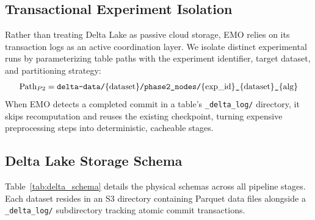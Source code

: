 \documentclass[conference,compsoc]{IEEEtran}
\begin{document}
\subsection{Transactional Experiment Isolation}
Rather than treating Delta Lake as passive cloud storage, EMO relies on its transaction logs as an active coordination layer. We isolate distinct experimental runs by parameterizing table paths with the experiment identifier, target dataset, and partitioning strategy:
\begin{equation}
\resizebox{0.95\linewidth}{!}{$
\mathrm{Path}_{P2} = \texttt{delta\text{-}data/}\{\mathrm{dataset}\}\texttt{/phase2\_nodes/}\{\mathrm{exp\_id}\}\texttt{\_}\{\mathrm{dataset}\}\texttt{\_}\{\mathrm{alg}\}
$}
\end{equation}
When EMO detects a completed commit in a table's \verb|_delta_log/| directory, it skips recomputation and reuses the existing checkpoint, turning expensive preprocessing steps into deterministic, cacheable stages.

\subsection{Delta Lake Storage Schema}
\label{sec:delta_schema}
Table~\ref{tab:delta_schema} details the physical schemas across all pipeline stages. Each dataset resides in an S3 directory containing Parquet data files alongside a \texttt{\_delta\_log/} subdirectory tracking atomic commit transactions.
\end{document}
